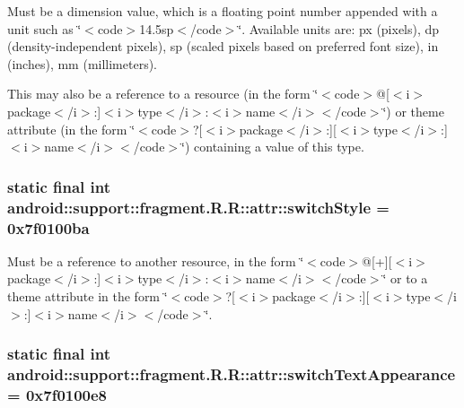 Must be a dimension value, which is a floating point number appended with a unit such as \char`\"{}$<$code$>$14.5sp$<$/code$>$\char`\"{}. Available units are: px (pixels), dp (density-independent pixels), sp (scaled pixels based on preferred font size), in (inches), mm (millimeters). 

This may also be a reference to a resource (in the form \char`\"{}$<$code$>$@\mbox{[}$<$i$>$package$<$/i$>$:\mbox{]}$<$i$>$type$<$/i$>$:$<$i$>$name$<$/i$>$$<$/code$>$\char`\"{}) or theme attribute (in the form \char`\"{}$<$code$>$?\mbox{[}$<$i$>$package$<$/i$>$:\mbox{]}\mbox{[}$<$i$>$type$<$/i$>$:\mbox{]}$<$i$>$name$<$/i$>$$<$/code$>$\char`\"{}) containing a value of this type. \hypertarget{classandroid_1_1support_1_1fragment_1_1_r_1_1attr_0b54eb8e86a78a8ca02adb57e0abce84}{
\subsubsection[{switchStyle}]{\setlength{\rightskip}{0pt plus 5cm}static final int android::support::fragment.R.R::attr::switchStyle = 0x7f0100ba}}
\label{classandroid_1_1support_1_1fragment_1_1_r_1_1attr_0b54eb8e86a78a8ca02adb57e0abce84}


Must be a reference to another resource, in the form \char`\"{}$<$code$>$@\mbox{[}+\mbox{]}\mbox{[}$<$i$>$package$<$/i$>$:\mbox{]}$<$i$>$type$<$/i$>$:$<$i$>$name$<$/i$>$$<$/code$>$\char`\"{} or to a theme attribute in the form \char`\"{}$<$code$>$?\mbox{[}$<$i$>$package$<$/i$>$:\mbox{]}\mbox{[}$<$i$>$type$<$/i$>$:\mbox{]}$<$i$>$name$<$/i$>$$<$/code$>$\char`\"{}. \hypertarget{classandroid_1_1support_1_1fragment_1_1_r_1_1attr_bfc352bbc7a2b70fd511bb7bdbe2ef31}{
\subsubsection[{switchTextAppearance}]{\setlength{\rightskip}{0pt plus 5cm}static final int android::support::fragment.R.R::attr::switchTextAppearance = 0x7f0100e8}}
\label{classandroid_1_1support_1_1fragment_1_1_r_1_1attr_bfc352bbc7a2b70fd511bb7bdbe2ef31}


